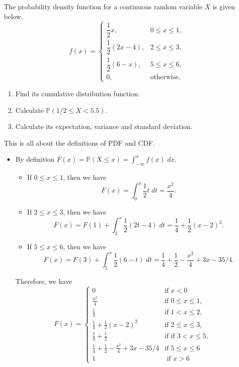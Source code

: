 \documentclass[../main.tex]{subfiles}
\begin{document}
\begin{exercise}
  The probability density function for a continuous random variable \(X\) is given below.
  \[
    f(x) =
    \begin{cases}
      \dfrac{1}{2} x, & 0 \le x \le 1, \\[8pt]
      \dfrac{1}{2}(2x - 4), & 2 \le x \le 3, \\[8pt]
      \dfrac{1}{2}(6 - x), & 5 \le x \le 6, \\[8pt]
      0, & \text{otherwise}.
    \end{cases}
  \]

  \begin{enumerate}
    \item Find its cumulative distribution function.
    \item Calculate \(\mathbb{P}(1/2 \le X < 5.5)\).
    \item Calculate its expectation, variance and standard deviation.
  \end{enumerate}

  \begin{solution}
    This is all about the definitions of PDF and CDF.

    \begin{itemize}
      \item By definition \(F(x) = \mathbb{P}(X \le x) = \int_{-\infty}^{x} f(x) \;dx\).  
        \begin{itemize}
          \item If \(0 \le x \le 1\), then we have
            \[
              F(x) = \int_{0}^{x} \frac{1}{2}t \;dt = \frac{x^{2}}{4}.
            \]

          \item If \(2 \le x \le 3\), then we have
            \[
              F(x) = F(1) + \int_{2}^{x} \frac{1}{2}(2t - 4) \;dt = \frac{1}{4} + \frac{1}{2}(x - 2)^{2}.
            \]

          \item If \(5 \le x \le 6\), then we have
            \[
              F(x) = F(3) + \int_{5}^{x} \frac{1}{2}(6 - t)\;dt = \frac{1}{4} + \frac{1}{2} - \frac{x^{2}}{4} + 3x - 35/4.
            \]
        \end{itemize}

        Therefore, we have
        \[
          F(x) = 
          \begin{cases}
            0 & \text{if } x < 0 \\[1ex]
            \frac{x^{2}}{4} & \text{if } 0 \le x \le 1, \\[1ex]
            \frac{1}{4} & \text{if } 1 < x \le 2, \\[1ex]
            \frac{1}{4} + \frac{1}{2}(x - 2)^{2} & \text{if } 2 \le x \le 3, \\[1ex]
            \frac{1}{4} + \frac{1}{2} & \text{if } \text{if } 3 < x \le 5, \\[1ex]
            \frac{1}{4} + \frac{1}{2} - \frac{x^{2}}{4} + 3x - 35/4 & \text{if } 5 \le x \le 6 \\[1ex]
            1 &\text{ if } x > 6
          \end{cases}
        \]



\end{itemize}
\end{solution}
\end{exercise}
\end{document}
